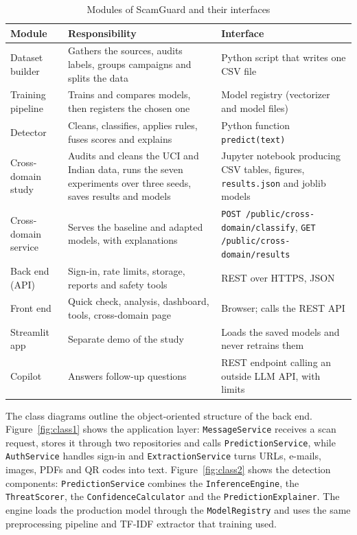 \begin{table}[H]
\centering
\caption{Modules of ScamGuard and their interfaces}
\label{tab:subsys}
\begin{tabular}{|L{3.2cm}|L{5.5cm}|L{5.2cm}|}
\hline
\textbf{Module} & \textbf{Responsibility} & \textbf{Interface} \\
\hline
Dataset builder & Gathers the sources, audits labels, groups campaigns and splits the data & Python script that writes one CSV file \\
\hline
Training pipeline & Trains and compares models, then registers the chosen one & Model registry (vectorizer and model files) \\
\hline
Detector & Cleans, classifies, applies rules, fuses scores and explains & Python function \texttt{predict(text)} \\
\hline
Cross-domain study & Audits and cleans the UCI and Indian data, runs the seven experiments over three seeds, saves results and models & Jupyter notebook producing CSV tables, figures, \texttt{results.json} and joblib models \\
\hline
Cross-domain service & Serves the baseline and adapted models, with explanations & \texttt{POST /public/cross-domain/classify}, \texttt{GET /public/cross-domain/results} \\
\hline
Back end (API) & Sign-in, rate limits, storage, reports and safety tools & REST over HTTPS, JSON \\
\hline
Front end & Quick check, analysis, dashboard, tools, cross-domain page & Browser; calls the REST API \\
\hline
Streamlit app & Separate demo of the study & Loads the saved models and never retrains them \\
\hline
Copilot & Answers follow-up questions & REST endpoint calling an outside LLM API, with limits \\
\hline
\end{tabular}
\end{table}

The class diagrams outline the object-oriented structure of the back end. Figure~\ref{fig:class1} shows the application layer: \texttt{MessageService} receives a scan request, stores it through two repositories and calls \texttt{PredictionService}, while \texttt{AuthService} handles sign-in and \texttt{ExtractionService} turns URLs, e-mails, images, PDFs and QR codes into text. Figure~\ref{fig:class2} shows the detection components: \texttt{PredictionService} combines the \texttt{InferenceEngine}, the \texttt{ThreatScorer}, the \texttt{ConfidenceCalculator} and the \texttt{PredictionExplainer}. The engine loads the production model through the \texttt{ModelRegistry} and uses the same preprocessing pipeline and TF-IDF extractor that training used.

